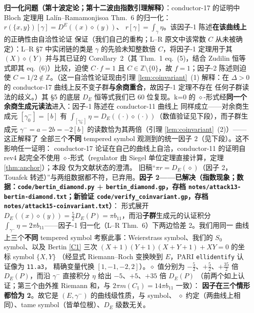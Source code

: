 \documentclass[11pt,a4paper]{ctexart}
\theoremstyle{remark}
\newcommand{\ZZ}{\mathbb{Z}}
\newcommand{\bN}{b_{11}}
\begin{document}
\textbf{归一化问题（第十波定论；第十二波由指数引理解释）}：conductor-17 的证明中 Bloch
定理用 Lal\'in--Ramamonjisoa Thm.~6 的归一化：$r(\{x,y\})[\gamma]=D^E((x)\diamond(y))$、
$r[\gamma]=\int_\gamma\eta$。该因子-1 陈述\textbf{在该曲线上}的正确性由自洽性论证
保证（我们自己的重构；L--R 原文中该常数 $C$ 从未被确定）：L--R \S7 中实闭链的类是
$\gamma$ 的先验未知整数倍 $C$，将因子-1 定理用于其 $(X)\diamond(Y)$ 并与其已证的
Corollary~2（其 Thm.~1 eq.~(5)，结合 Zudilin 恒等式即其 eq.~(6)）比较，迫使
$C\cdot f=1$ 且 $C\in\ZZ\setminus\{0\}$，故 $f=1$；因子-2 陈述则迫使
$C=1/2\notin\ZZ$。（这一自洽性论证现由引理 \ref{lem:coinvariant}~(1) 解释：在
$\Delta>0$ 的 conductor-17 曲线上反不变子群\textbf{与余商重合}，故因子-1 定理不存在
任何子群读法的歧义。）其 \S5 的底层 $D_E$ 恒等式我们已 60 位复现。k=0 的
$\diamond$-形式经\textbf{同一个余商生成元读法}进入：因子-1 陈述在 conductor-11 曲线上
同样成立——对余商生成元 $[\gamma^-_0]=[b]$ 有
$\int_{[\gamma^-_0]}\eta=D_E((\cdot)\diamond(\cdot))$（数值验证见下段），而子群生成元
$\gamma^-=a-2b=-2[b]$ 的读数恰为其两倍（引理 \ref{lem:coinvariant}~(2)）——这正解释了
全部三个\textbf{不同} tempered symbol 观测到的统一因子 $2$（见下段）。这不影响任一证明：
conductor-17 论证在自己的曲线上自洽，conductor-11 的证明自 rev4 起完全不使用
$\diamond$-形式（regulator 由 Siegel 单位定理直接计算，定理 \ref{thm:anchor}）；本段
仅为文献状态的澄清。
旧稿``$\pi r=D_E(\diamond)$（因子 2，Touafek 转述）''与两组数据都不符，已弃用。\textbf{因子 2——已解决（指数现象；数据：\texttt{code/bertin\_diamond.py} +
\texttt{bertin\_diamond.gp}，存档 \texttt{notes/attack13-bertin-diamond.txt}；新验证
\texttt{code/verify\_coinvariant.gp}，存档 \texttt{notes/attack15-coinvariant.txt}）}：
形式展开 $D_E((x)\diamond(y))=\frac52D_E(P)=\pi\bN$，而沿\textbf{子群}生成元的认证积分
$\int_{\gamma^-}\eta=2\pi\bN$——因子-1 归一化（L--R Thm.~6）下两边恰差 2。我们用同一
曲线上三个\textbf{不同} tempered symbol 考察此事：Weierstrass symbol、我们的 $S_0$
symbol、以及 Bertin \eqref{C1} 三次 $(X+1)(Y+1)(X+Y+1)+XY=0$ 的坐标 symbol $\{X,Y\}$
（经显式 Riemann--Roch 变换映到 $E$，PARI \texttt{ellidentify} 认证像为 \texttt{11.a3}，
精确变量代换 $[1,-1,-2,2]$）。$\diamond$ 值分别为 $-\frac52$、$+\frac52$、$+\frac{35}{2}$
倍 $D_E(P)$，而沿 $\gamma^-$ 直接积分 $\eta$ 给出 $-5$、$+5$、$+35$ 倍 $D_E(P)$
（前两个如上认证；第三个由外推 Riemann 和，与 $2\pi m(C_1)=14\pi\bN$ 一致）：
\textbf{因子在三个情形都恰为 2}。故它是 $(E,\gamma^-)$ 的曲线级性质，与 symbol、
$\diamond$ 约定（两曲线上相同）、tame symbol（皆单位根）、$D_E$ 级数无关。
\end{document}
